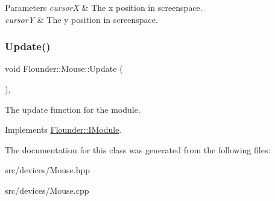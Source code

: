 \begin{DoxyParams}{Parameters}
{\em cursorX} & The x position in screenspace. \\
\hline
{\em cursorY} & The y position in screenspace. \\
\hline
\end{DoxyParams}
\mbox{\label{class_flounder_1_1_mouse_a4fb0490c519e9cecccc6ef8357983025}} 
\subsubsection{\texorpdfstring{Update()}{Update()}}
{\footnotesize\ttfamily void Flounder\+::\+Mouse\+::\+Update (\begin{DoxyParamCaption}{ }\end{DoxyParamCaption})\hspace{0.3cm}{\ttfamily [override]}, {\ttfamily [virtual]}}



The update function for the module. 



Implements \hyperlink{class_flounder_1_1_i_module_a1812bb03a6990e4698a10c043fa25fde}{Flounder\+::\+I\+Module}.



The documentation for this class was generated from the following files\+:\begin{DoxyCompactItemize}
\item 
src/devices/Mouse.\+hpp\item 
src/devices/Mouse.\+cpp\end{DoxyCompactItemize}
